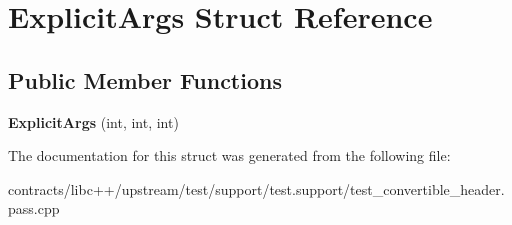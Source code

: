 \hypertarget{struct_explicit_args}{}\section{Explicit\+Args Struct Reference}
\label{struct_explicit_args}
\subsection*{Public Member Functions}
\begin{DoxyCompactItemize}
\item 
\mbox{\label{struct_explicit_args_af530b4b1317b2d550e7057c28b437b43}} 
{\bfseries Explicit\+Args} (int, int, int)
\end{DoxyCompactItemize}


The documentation for this struct was generated from the following file\+:\begin{DoxyCompactItemize}
\item 
contracts/libc++/upstream/test/support/test.\+support/test\+\_\+convertible\+\_\+header.\+pass.\+cpp\end{DoxyCompactItemize}
